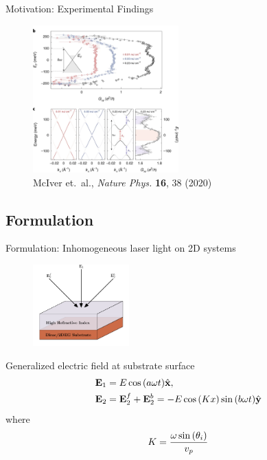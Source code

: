 \documentclass[xcolor=dvipsnames,10pt,aspectratio=169]{beamer}
\let\oldhat\hat
\renewcommand{\hat}[1]{\oldhat{\mathbf{#1}}}
\renewcommand{\vec}[1]{\mathbf{#1}}
\newcommand{\MO}{Motivation}
\newcommand{\FO}{Formulation}
\begin{document}
  \begin{frame}{\MO: Experimental Findings}
    \begin{figure}
      \includegraphics[width=0.5\textwidth]{./figures/fqahe-dirac.png}
      \caption*{\footnotesize McIver et.\ al., \textit{Nature Phys.} \textbf{16}, 38 (2020)}
    \end{figure}
  \end{frame}

  \subsection{\FO}

  \begin{frame}{\FO: Inhomogeneous laser light on 2D systems}
    \begin{figure}
      \includegraphics[width=0.33\textwidth]{./figures/fll-setup.pdf}
    \end{figure}
    Generalized electric field at substrate surface
    \begin{align*}
      \small
      \vec{E}_1 &= E\cos{(a\omega t)} \hat{x},\\
      \vec{E}_2 &= \vec{E}_2^f + \vec{E}_2^b = -E\cos{(Kx)}\sin{(b\omega t)} \hat{y}
    \end{align*}
    where
    \begin{equation}
      \small
      K = \frac{\omega \sin{(\theta_i)}}{v_p}
    \end{equation}

  \end{frame}
\end{document}
